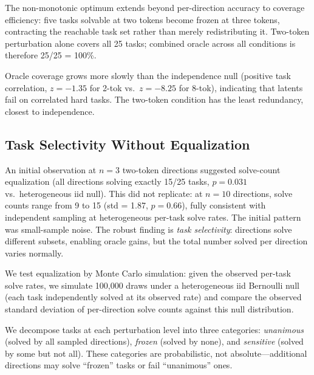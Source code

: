 \documentclass{article}
\begin{document}
The non-monotonic optimum extends beyond per-direction accuracy to
coverage efficiency: five tasks solvable at two tokens become frozen
at three tokens, contracting the reachable task set rather than merely
redistributing it. Two-token perturbation alone covers all 25 tasks;
combined oracle across all conditions is therefore 25/25 = 100\%.

Oracle coverage grows more slowly than the independence null (positive
task correlation, $z = -1.35$ for 2-tok vs.\ $z = -8.25$ for 8-tok),
indicating that latents fail on correlated hard tasks. The two-token
condition has the least redundancy, closest to independence.

\subsection{Task Selectivity Without Equalization}
\label{sec:equalization}

An initial observation at $n = 3$ two-token directions suggested
solve-count equalization (all directions solving exactly 15/25 tasks,
$p = 0.031$ vs.\ heterogeneous iid null). This did not replicate:
at $n = 10$ directions, solve counts range from 9 to 15
(std = 1.87, $p = 0.66$), fully consistent with independent sampling
at heterogeneous per-task solve rates. The initial pattern was
small-sample noise. The robust finding is \emph{task selectivity}:
directions solve different subsets, enabling oracle gains, but the
total number solved per direction varies normally.

We test equalization by Monte Carlo simulation: given the observed
per-task solve rates, we simulate 100{,}000 draws under a
heterogeneous iid Bernoulli null (each task independently solved at
its observed rate) and compare the observed standard deviation of
per-direction solve counts against this null distribution.

We decompose tasks at each perturbation level into three categories:
\emph{unanimous} (solved by all sampled directions), \emph{frozen}
(solved by none), and \emph{sensitive} (solved by some but not all).
These categories are probabilistic, not absolute---additional directions
may solve ``frozen'' tasks or fail ``unanimous'' ones.
\end{document}

